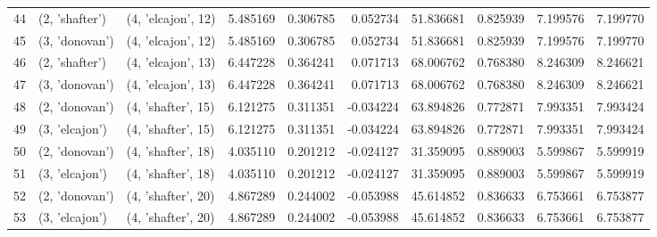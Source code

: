 \begin{tabular}{lllrrrrrrr}
44 &   (2, 'shafter') &  (4, 'elcajon', 12) &  5.485169 &  0.306785 &  0.052734 &   51.836681 &  0.825939 &   7.199576 &   7.199770 \\
45 &   (3, 'donovan') &  (4, 'elcajon', 12) &  5.485169 &  0.306785 &  0.052734 &   51.836681 &  0.825939 &   7.199576 &   7.199770 \\
46 &   (2, 'shafter') &  (4, 'elcajon', 13) &  6.447228 &  0.364241 &  0.071713 &   68.006762 &  0.768380 &   8.246309 &   8.246621 \\
47 &   (3, 'donovan') &  (4, 'elcajon', 13) &  6.447228 &  0.364241 &  0.071713 &   68.006762 &  0.768380 &   8.246309 &   8.246621 \\
48 &   (2, 'donovan') &  (4, 'shafter', 15) &  6.121275 &  0.311351 & -0.034224 &   63.894826 &  0.772871 &   7.993351 &   7.993424 \\
49 &   (3, 'elcajon') &  (4, 'shafter', 15) &  6.121275 &  0.311351 & -0.034224 &   63.894826 &  0.772871 &   7.993351 &   7.993424 \\
50 &   (2, 'donovan') &  (4, 'shafter', 18) &  4.035110 &  0.201212 & -0.024127 &   31.359095 &  0.889003 &   5.599867 &   5.599919 \\
51 &   (3, 'elcajon') &  (4, 'shafter', 18) &  4.035110 &  0.201212 & -0.024127 &   31.359095 &  0.889003 &   5.599867 &   5.599919 \\
52 &   (2, 'donovan') &  (4, 'shafter', 20) &  4.867289 &  0.244002 & -0.053988 &   45.614852 &  0.836633 &   6.753661 &   6.753877 \\
53 &   (3, 'elcajon') &  (4, 'shafter', 20) &  4.867289 &  0.244002 & -0.053988 &   45.614852 &  0.836633 &   6.753661 &   6.753877 \\
\bottomrule
\end{tabular}
